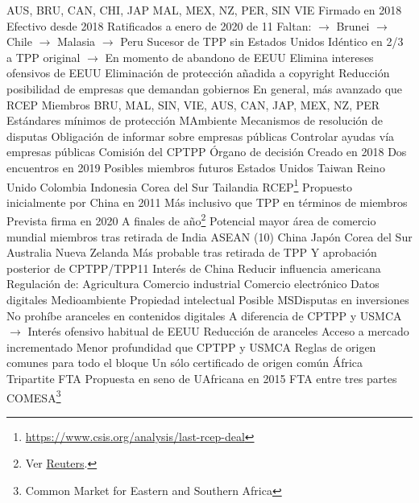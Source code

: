 \documentclass{nuevotema}
\begin{document}
\begin{esquemal}
				\4[] AUS, BRU, CAN, CHI, JAP
				\4[] MAL, MEX, NZ, PER, SIN
				\4[] VIE
				\4 Firmado en 2018
				\4 Efectivo desde 2018
				\4 Ratificados a enero de 2020
				 de 11
				\4[] Faltan:
				\4[] $\to$ Brunei
				\4[] $\to$ Chile
				\4[] $\to$ Malasia
				\4[] $\to$ Peru
				\4 Sucesor de TPP sin Estados Unidos
				\4[] Idéntico en 2/3 a TPP original
				\4[] $\to$ En momento de abandono de EEUU
				\4 Elimina intereses ofensivos de EEUU
				\4[] Eliminación de protección añadida a copyright
				\4[] Reducción posibilidad de empresas que demandan gobiernos
				\4 En general, más avanzado que RCEP
				\4 Miembros
				\4[] BRU, MAL, SIN, VIE, AUS, CAN, JAP,
				\4[] MEX, NZ, PER
				\4 Estándares mínimos de protección MAmbiente
				\4 Mecanismos de resolución de disputas
				\4 Obligación de informar sobre empresas públicas
				\4[] Controlar ayudas vía empresas públicas
				\4 Comisión del CPTPP
				\4[] Órgano de decisión
				\4[] Creado en 2018
				\4[] Dos encuentros en 2019
				\4 Posibles miembros futuros
				\4[] Estados Unidos
				\4[] Taiwan
				\4[] Reino Unido
				\4[] Colombia
				\4[] Indonesia
				\4[] Corea del Sur
				\4[] Tailandia
			\3 RCEP\footnote{\url{https://www.csis.org/analysis/last-rcep-deal}}
				\4 Propuesto inicialmente por China en 2011
				\4[] Más inclusivo que TPP en términos de miembros
				\4 Prevista firma en 2020
				\4[] A finales de año\footnote{Ver \href{https://www.reuters.com/article/us-asia-trade-rcep/rcep-trade-pact-on-track-for-2020-signing-ministers-idUSKBN23U0U9}{Reuters}.}
				\4 Potencial mayor área de comercio mundial
				 miembros tras retirada de India
				\4[] ASEAN (10)
				\4[] China
				\4[] Japón
				\4[] Corea del Sur
				\4[] Australia
				\4[] Nueva Zelanda
				\4 Más probable tras retirada de TPP
				\4[] Y aprobación posterior de CPTPP/TPP11
				\4 Interés de China
				\4[] Reducir influencia americana
				\4 Regulación de:
				\4[] Agricultura
				\4[] Comercio industrial
				\4[] Comercio electrónico
				\4[] Datos digitales
				\4[] Medioambiente
				\4[] Propiedad intelectual
				\4 Posible MSDisputas en inversiones
				\4 No prohíbe aranceles en contenidos digitales
				\4[] A diferencia de CPTPP y USMCA
				\4[] $\to$ Interés ofensivo habitual de EEUU
				\4 Reducción de aranceles
				\4 Acceso a mercado incrementado
				\4 Menor profundidad que CPTPP y USMCA
				\4 Reglas de origen comunes para todo el bloque
				\4[] Un sólo certificado de origen común
		\2 África
			\3 Tripartite FTA
				\4 Propuesta en seno de UAfricana en 2015
				\4 FTA entre tres partes
				\4[] COMESA\footnote{Common Market for Eastern and Southern Africa}

\end{esquemal}
\end{document}
